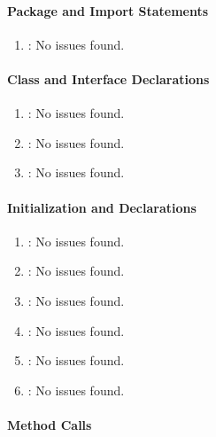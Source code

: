 \paragraph{Package and Import Statements} %
\label{par:package_and_import_statements}

\begin{enumerate} [resume]
	\item \emph{\checkX}: No issues found.
\end{enumerate}

\paragraph{Class and Interface Declarations} %
\label{par:class_and_interface_declarations}

\begin{enumerate} [resume]
	\item \emph{\checkY}: No issues found.
	\item \emph{\checkZ}: No issues found.
	\item \emph{\checkAA}: No issues found.
\end{enumerate}

\paragraph{Initialization and Declarations} %
\label{par:initialization_and_declarations}

\begin{enumerate} [resume]
	\item \emph{\checkAB}: No issues found.
	\item \emph{\checkAC}: No issues found.
	\item \emph{\checkAD}: No issues found.
	\item \emph{\checkAE}: No issues found.
	\item \emph{\checkAF}: No issues found.
	\item \emph{\checkAG}: No issues found.
\end{enumerate}

\paragraph{Method Calls} %
\label{par:method_calls}

